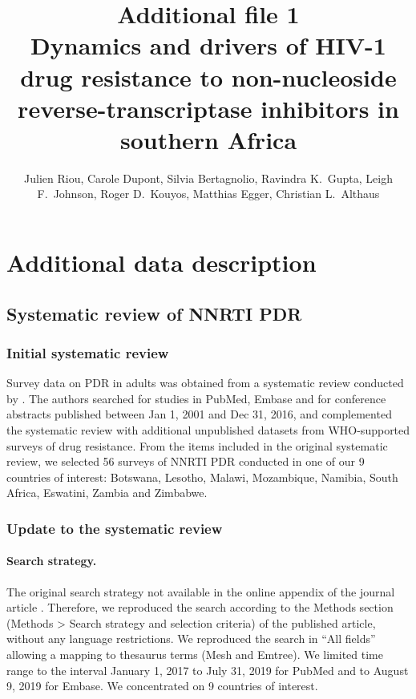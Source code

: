 \documentclass{article}
\title{{\sc Additional file 1} \\[.5em] Dynamics and drivers of HIV-1 drug resistance to non-nucleoside reverse-transcriptase inhibitors in southern Africa }
\author{Julien Riou, Carole Dupont, Silvia Bertagnolio, Ravindra K.~Gupta, Leigh F.~Johnson, Roger D.~Kouyos, Matthias Egger, Christian L.~Althaus}
\date{}
\begin{document}
	\maketitle
	\tableofcontents
	\clearpage
	
	\section{Additional data description}
	\subsection{Systematic review of NNRTI PDR}
	
	
	
	
	\subsubsection{Initial systematic review}
	
	Survey data on PDR in adults was obtained from a systematic review conducted by \cite{gupta2018hiv}.
	The authors searched for studies in PubMed, Embase and for conference abstracts published between Jan 1, 2001 and Dec 31, 2016, and complemented the systematic review with additional unpublished datasets from WHO-supported surveys of drug resistance. From the items included in the original systematic review, we selected 56 surveys of NNRTI PDR conducted in one of our 9 countries of interest: Botswana, Lesotho, Malawi, Mozambique, Namibia, South Africa, Eswatini, Zambia and Zimbabwe. 
	
	
	\subsubsection{Update to the systematic review}
	
	\paragraph{Search strategy.}
	The original search strategy not available in the online appendix of the journal article \cite{gupta2018hiv}. Therefore, we reproduced the search according to the Methods section (Methods > Search strategy and selection criteria) of the published article, without any language restrictions. We reproduced the search in “All fields” allowing a mapping to thesaurus terms (Mesh and Emtree). We limited time range to the interval January 1, 2017 to July 31, 2019 for PubMed and to August 9, 2019 for Embase.
	We concentrated on 9 countries of interest.
	
\end{document}
